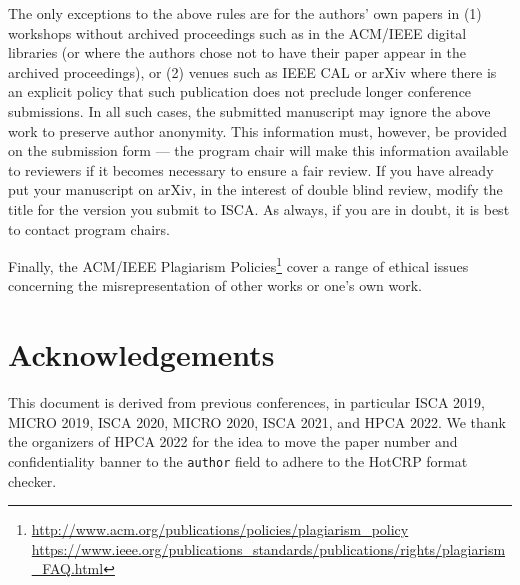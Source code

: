 \documentclass[conference]{IEEEtran}
\begin{document}
The only exceptions to the above rules are for the authors' own papers
in (1) workshops without archived proceedings such as in the ACM/IEEE
digital libraries (or where the authors chose not to have their paper
appear in the archived proceedings), or (2) venues such as IEEE CAL or
arXiv where there is an explicit policy that such publication does not
preclude longer conference submissions.  In all such cases, the
submitted manuscript may ignore the above work to preserve author
anonymity. This information must, however, be provided on the
submission form --- the program chair will make this information available
to reviewers if it becomes necessary to ensure a fair review.
If you have already put your manuscript on arXiv, in the interest of
double blind review, modify the title for the version you submit to ISCA.
As always, if you are in doubt, it is best to contact program chairs.


Finally, the ACM/IEEE Plagiarism Policies\footnote{\url{http://www.acm.org/publications/policies/plagiarism_policy}\\
\url{https://www.ieee.org/publications_standards/publications/rights/plagiarism_FAQ.html}}
cover a range of ethical issues concerning the misrepresentation of
other works or one's own work.


\section*{Acknowledgements}
This document is derived from previous conferences, in particular ISCA 2019,
MICRO 2019, ISCA 2020, MICRO 2020, ISCA 2021, and HPCA 2022. We thank the
organizers of HPCA 2022 for the idea to move the paper number and
confidentiality banner to the \texttt{author} field to adhere to the HotCRP
format checker.





\end{document}
